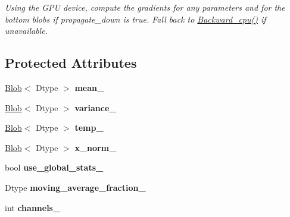 \begin{DoxyCompactItemize}
\begin{DoxyCompactList}\small\item\em Using the G\+PU device, compute the gradients for any parameters and for the bottom blobs if propagate\+\_\+down is true. Fall back to \hyperlink{classcaffe_1_1BatchNormLayer_ac3dd99d7fc010d3a2567034c50324b60}{Backward\+\_\+cpu()} if unavailable. \end{DoxyCompactList}\end{DoxyCompactItemize}
\subsection*{Protected Attributes}
\begin{DoxyCompactItemize}
\item 
\hyperlink{classcaffe_1_1Blob}{Blob}$<$ Dtype $>$ {\bfseries mean\+\_\+}\hypertarget{classcaffe_1_1BatchNormLayer_a40bdb2eb1eb8c1af257d83d1ee34477e}{}\label{classcaffe_1_1BatchNormLayer_a40bdb2eb1eb8c1af257d83d1ee34477e}

\item 
\hyperlink{classcaffe_1_1Blob}{Blob}$<$ Dtype $>$ {\bfseries variance\+\_\+}\hypertarget{classcaffe_1_1BatchNormLayer_a60af867dc745b550056fdb0bf5253fb2}{}\label{classcaffe_1_1BatchNormLayer_a60af867dc745b550056fdb0bf5253fb2}

\item 
\hyperlink{classcaffe_1_1Blob}{Blob}$<$ Dtype $>$ {\bfseries temp\+\_\+}\hypertarget{classcaffe_1_1BatchNormLayer_a385f18e414274c8398d7f68f7a21fd47}{}\label{classcaffe_1_1BatchNormLayer_a385f18e414274c8398d7f68f7a21fd47}

\item 
\hyperlink{classcaffe_1_1Blob}{Blob}$<$ Dtype $>$ {\bfseries x\+\_\+norm\+\_\+}\hypertarget{classcaffe_1_1BatchNormLayer_ae6ff1b957b514a954dcb62ea5464d3eb}{}\label{classcaffe_1_1BatchNormLayer_ae6ff1b957b514a954dcb62ea5464d3eb}

\item 
bool {\bfseries use\+\_\+global\+\_\+stats\+\_\+}\hypertarget{classcaffe_1_1BatchNormLayer_ad3a29633c4b31c90bc8524f271279deb}{}\label{classcaffe_1_1BatchNormLayer_ad3a29633c4b31c90bc8524f271279deb}

\item 
Dtype {\bfseries moving\+\_\+average\+\_\+fraction\+\_\+}\hypertarget{classcaffe_1_1BatchNormLayer_a080385766fcb5df87d46e5ce9ed6168e}{}\label{classcaffe_1_1BatchNormLayer_a080385766fcb5df87d46e5ce9ed6168e}

\item 
int {\bfseries channels\+\_\+}\hypertarget{classcaffe_1_1BatchNormLayer_aceaba0d4877aefb36a320c9a147a613c}{}\label{classcaffe_1_1BatchNormLayer_aceaba0d4877aefb36a320c9a147a613c}


\end{DoxyCompactItemize}
